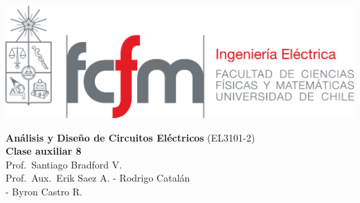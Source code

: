 \documentclass[
  11pt,
  letterpaper,
   addpoints,
   answers
  ]{exam}
\begin{document}
\noindent
\begin{minipage}{0.47\textwidth}
\includegraphics[width=\textwidth]{../fcfm_die}
\end{minipage}
\begin{minipage}{0.53\textwidth}
    
\begin{center} 
\large\textbf{Análisis y Diseño de Circuitos Eléctricos} (EL3101-2) \\
\large\textbf{Clase auxiliar 8} \\
\normalsize Prof.~Santiago Bradford V.\\
\normalsize Prof.~Aux.~Erik Saez A. - Rodrigo Catalán\\
             - Byron Castro R.
\end{center}
\end{minipage}

\vspace{0.5cm}
\noindent
\vspace{.85cm}
\end{document}
